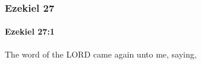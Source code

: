 	\subsubsection{Ezekiel 27} %
		\label{EZEKIEL-27}

		\paragraph{Ezekiel 27:1} %
			\label{EZEKIEL-27-1}

			The word of the LORD came again unto me, saying,


